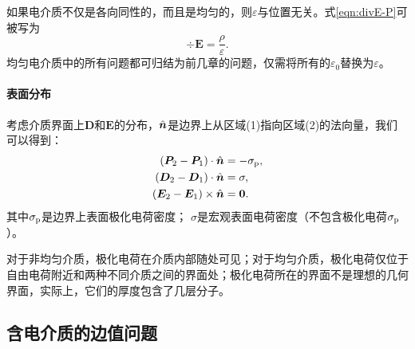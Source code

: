 如果电介质不仅是各向同性的，而且是均匀的，则$\varepsilon$与位置无关。式\eqref{eqn:divE-P}可被写为 
\begin{equation}
    \div\bm E = \frac\rho\varepsilon.
\end{equation}
均匀电介质中的所有问题都可归结为前几章的问题，仅需将所有的$\varepsilon_0$替换为$\varepsilon$。

\paragraph{表面分布}

考虑介质界面上$\bm D$和$\bm E$的分布，$\mathop{}\!\hat{\bm{n}}$是边界上从区域(1)指向区域(2)的法向量，我们可以得到：
\begin{subequations}
    \begin{align}
        \label{eqn:Pn2-Pn1}
        (\bm P_2 - \bm P_1) \cdot \mathop{}\!\hat{\bm{n}} &= -\sigma_\mathrm p,\\
        \label{eqn:Dn2-Dn1}
        (\bm D_2 - \bm D_1) \cdot \mathop{}\!\hat{\bm{n}} &= \sigma,\\
        \label{eqn:Et2-Et1}
        (\bm E_2 - \bm E_1) \times \mathop{}\!\hat{\bm{n}} &= \bm 0.
    \end{align}
\end{subequations}
其中$\sigma_\mathrm p$是边界上表面极化电荷密度；
$\sigma$是宏观表面电荷密度（不包含极化电荷$\sigma_\mathrm p$）。

对于非均匀介质，极化电荷在介质内部随处可见；对于均匀介质，极化电荷仅位于自由电荷附近和两种不同介质之间的界面处；极化电荷所在的界面不是理想的几何界面，实际上，它们的厚度包含了几层分子。

\subsection{含电介质的边值问题}
\label{ssec:boundary-value problem with dielectrics}

